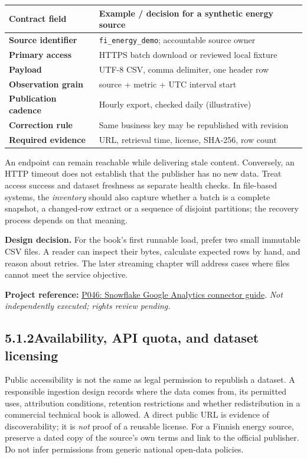 \documentclass[11pt,twoside]{article}
\newcommand{\topic}[2]{\subsection*{#1\quad #2}}
\newcommand{\repo}[2]{\par\begingroup\fontsize{8.0}{9.6}\selectfont\sffamily\color{inkgray}\textbf{Project reference:} \href{#2}{#1}. \textit{Not independently executed; rights review pending.}\par\endgroup}
\begin{document}
\begin{center}\small\begin{tabularx}{\linewidth}{@{}>{\bfseries}p{33mm}X@{}}\toprule
Contract field & Example / decision for a synthetic energy source\\\midrule
Source identifier & \texttt{fi\_energy\_demo}; accountable source owner\\
Primary access & HTTPS batch download or reviewed local fixture\\
Payload & UTF-8 CSV, comma delimiter, one header row\\
Observation grain & source + metric + UTC interval start\\
Publication cadence & Hourly export, checked daily (illustrative)\\
Correction rule & Same business key may be republished with revision\\
Required evidence & URL, retrieval time, license, SHA-256, row count\\\bottomrule\end{tabularx}\end{center}
An endpoint can remain reachable while delivering stale content. Conversely, an HTTP timeout does not establish that the publisher has no new data. Treat access success and dataset freshness as separate health checks. In file-based systems, the \emph{inventory} should also capture whether a batch is a complete snapshot, a changed-row extract or a sequence of disjoint partitions; the recovery process depends on that meaning.

\textbf{Design decision.} For the book's first runnable load, prefer two small immutable CSV files. A reader can inspect their bytes, calculate expected rows by hand, and reason about retries. The later streaming chapter will address cases where files cannot meet the service objective.

\repo{P046: Snowflake Google Analytics connector guide}{https://github.com/Snowflake-Labs/sfguide-getting-started-with-snowflake-connector-for-google-analytics}
\newpage
\topic{5.1.2}{Availability, API quota, and dataset licensing}
Public accessibility is not the same as legal permission to republish a dataset. A responsible ingestion design records where the data comes from, its permitted uses, attribution conditions, retention restrictions and whether redistribution in a commercial technical book is allowed. A direct public URL is evidence of discoverability; it is \emph{not} proof of a reusable license. For a Finnish energy source, preserve a dated copy of the source's own terms and link to the official publisher. Do not infer permissions from generic national open-data policies.
\end{document}
